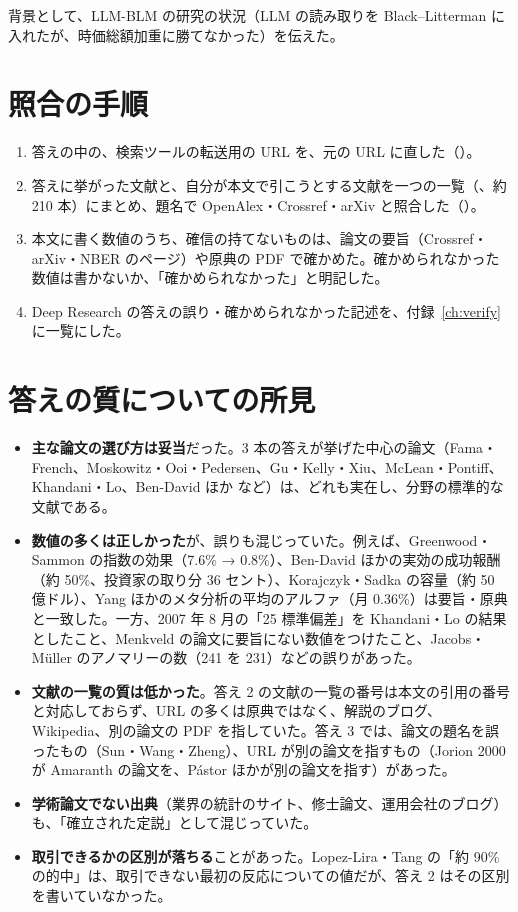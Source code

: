背景として、LLM-BLM の研究の状況（LLM の読み取りを Black--Litterman に入れたが、時価総額加重に勝てなかった）を伝えた。

\section{照合の手順}

\begin{enumerate}
\item 答えの中の、検索ツールの転送用の URL を、元の URL に直した（）。
\item 答えに挙がった文献と、自分が本文で引こうとする文献を一つの一覧（、約 210 本）にまとめ、題名で OpenAlex・Crossref・arXiv と照合した（）。
\item 本文に書く数値のうち、確信の持てないものは、論文の要旨（Crossref・arXiv・NBER のページ）や原典の PDF で確かめた。確かめられなかった数値は書かないか、「確かめられなかった」と明記した。
\item Deep Research の答えの誤り・確かめられなかった記述を、付録~\ref{ch:verify} に一覧にした。
\end{enumerate}

\section{答えの質についての所見}

\begin{itemize}
\item \textbf{主な論文の選び方は妥当}だった。3 本の答えが挙げた中心の論文（Fama・French、Moskowitz・Ooi・Pedersen、Gu・Kelly・Xiu、McLean・Pontiff、Khandani・Lo、Ben-David ほか など）は、どれも実在し、分野の標準的な文献である。
\item \textbf{数値の多くは正しかった}が、誤りも混じっていた。例えば、Greenwood・Sammon の指数の効果（7.6\% → 0.8\%）、Ben-David ほかの実効の成功報酬（約 50\%、投資家の取り分 36 セント）、Korajczyk・Sadka の容量（約 50 億ドル）、Yang ほかのメタ分析の平均のアルファ（月 0.36\%）は要旨・原典と一致した。一方、2007 年 8 月の「25 標準偏差」を Khandani・Lo の結果としたこと、Menkveld の論文に要旨にない数値をつけたこと、Jacobs・Müller のアノマリーの数（241 を 231）などの誤りがあった。
\item \textbf{文献の一覧の質は低かった}。答え 2 の文献の一覧の番号は本文の引用の番号と対応しておらず、URL の多くは原典ではなく、解説のブログ、Wikipedia、別の論文の PDF を指していた。答え 3 では、論文の題名を誤ったもの（Sun・Wang・Zheng）、URL が別の論文を指すもの（Jorion 2000 が Amaranth の論文を、Pástor ほかが別の論文を指す）があった。
\item \textbf{学術論文でない出典}（業界の統計のサイト、修士論文、運用会社のブログ）も、「確立された定説」として混じっていた。
\item \textbf{取引できるかの区別が落ちる}ことがあった。Lopez-Lira・Tang の「約 90\% の的中」は、取引できない最初の反応についての値だが、答え 2 はその区別を書いていなかった。
\end{itemize}

